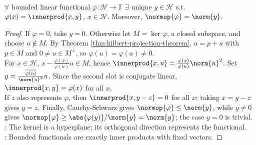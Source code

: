 \begin{theorem} \label{thm:riesz-representation-hilbert-space} \\
$\forall$ bounded linear functional $\varphi:\mathcal{H}\to\mathbb{F}$ $\exists$ unique $y\in\mathcal{H}$ s.t. $\varphi(x)=\innerprod{x,y}$, $x\in\mathcal{H}$. Moreover, $\normop{\varphi}=\norm{y}$.
\begin{proof}
If $\varphi=0$, take $y=0$. Otherwise let $M=\ker\varphi$, a closed subspace, and choose $a\notin M$. By Theorem \ref{thm:hilbert-projection-theorem}, $a=p+u$ with $p\in M$ and $0\neq u\in M^\perp$, so $\varphi(u)=\varphi(a)\neq0$.\\
For $x\in\mathcal{H}$, $x-\frac{\varphi(x)}{\varphi(u)}u\in M$, hence $\innerprod{x,u}=\frac{\varphi(x)}{\varphi(u)}\norm{u}^2$. Set $y=\frac{\overline{\varphi(u)}}{\norm{u}^2}u$. Since the second slot is conjugate linear, $\innerprod{x,y}=\varphi(x)$ for all $x$.\\
If $z$ also represents $\varphi$, then $\innerprod{x,y-z}=0$ for all $x$; taking $x=y-z$ gives $y=z$. Finally, Cauchy-Schwarz gives $\normop{\varphi}\leq\norm{y}$, while $y\neq0$ gives $\normop{\varphi}\geq\abs{\varphi(y)}/\norm{y}=\norm{y}$; the case $y=0$ is trivial.\\
: The kernel is a hyperplane; its orthogonal direction represents the functional.\\
: Bounded functionals are exactly inner products with fixed vectors.
\end{proof}
\end{theorem}

